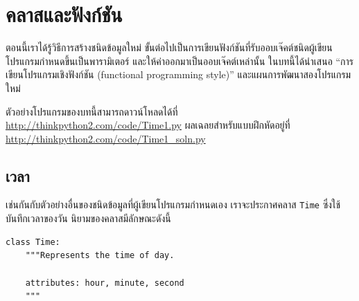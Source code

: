\chapter{คลาสและฟังก์ชัน} %
\label{time}


ตอนนี้เราได้รู้วิธีการสร้างชนิดข้อมูลใหม่ ขั้นต่อไปเป็นการเขียนฟังก์ชันที่รับออบเจ๊คต์ชนิดผู้เขียนโปรแกรมกำหนดขึ้นเป็นพารามิเตอร์
และให้ค่าออกมาเป็นออบเจ๊คต์เหล่านั้น ในบทนี้ได้นำเสนอ ``การเขียนโปรแกรมเชิงฟังก์ชัน (functional programming style)'' และแผนการพัฒนาสองโปรแกรมใหม่



ตัวอย่างโปรแกรมของบทนี้สามารถดาวน์โหลดได้ที่ \url{http://thinkpython2.com/code/Time1.py}
ผลเฉลยสำหรับแบบฝึกหัดอยู่ที่ \url{http://thinkpython2.com/code/Time1_soln.py}

\section{เวลา} %
\label{isafter}

เช่นกันกับตัวอย่างอื่นของชนิดข้อมูลที่ผู้เขียนโปรแกรมกำหนดเอง เราจะประกาศคลาส {\tt Time} ซึ่งใช้บันทึกเวลาของวัน นิยามของคลาสมีลักษณะดังนี้

\begin{verbatim}
class Time:
    """Represents the time of day.
       
    attributes: hour, minute, second
    """
\end{verbatim}
%

